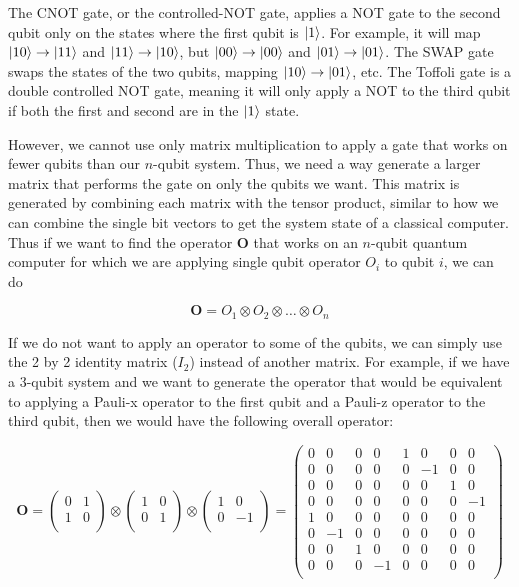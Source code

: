 \documentclass[11pt]{report}
\newcommand{\?}{\stackrel{?}{=}}
\begin{document}
The CNOT gate, or the controlled-NOT gate, applies a NOT gate to the second qubit only on the states where the first qubit is $\ket{1}$. For example, it will map $\ket{10} \to \ket{11}$ and $\ket{11} \to \ket{10}$, but $\ket{00} \to \ket{00}$ and $\ket{01} \to \ket{01}$. The SWAP gate swaps the states of the two qubits, mapping $\ket{10} \to \ket{01}$, etc. The Toffoli gate is a double controlled NOT gate, meaning it will only apply a NOT to the third qubit if both the first and second are in the $\ket{1}$ state.

However, we cannot use only matrix multiplication to apply a gate that works on fewer qubits than our $n$-qubit system. Thus, we need a way generate a larger matrix that performs the gate on only the qubits we want. This matrix is generated by combining each matrix with the tensor product, similar to how we can combine the single bit vectors to get the system state of a classical computer. Thus if we want to find the operator $\mathbf{O}$ that works on an $n$-qubit quantum computer for which we are applying single qubit operator $O_i$ to qubit $i$, we can do

$$\mathbf{O} = O_1 \otimes O_2 \otimes \ldots \otimes O_n$$

If we do not want to apply an operator to some of the qubits, we can simply use the 2 by 2 identity matrix ($I_2$) instead of another matrix. For example, if we have a 3-qubit system and we want to generate the operator that would be equivalent to applying a Pauli-x operator to the first qubit and a Pauli-z operator to the third qubit, then we would have the following overall operator:

$$\mathbf{O} = \begin{pmatrix}0 & 1 \\1 & 0 \\\end{pmatrix} \otimes \begin{pmatrix}1 & 0 \\0 & 1 \\\end{pmatrix} \otimes \begin{pmatrix}1 & 0 \\0 & -1 \\\end{pmatrix} = \begin{pmatrix}
0 & 0 & 0 & 0 & 1 & 0 & 0 & 0 \\
0 & 0 & 0 & 0 & 0 & -1 & 0 & 0 \\
0 & 0 & 0 & 0 & 0 & 0 & 1 & 0 \\
0 & 0 & 0 & 0 & 0 & 0 & 0 & -1 \\
1 & 0 & 0 & 0 & 0 & 0 & 0 & 0 \\
0 & -1 & 0 & 0 & 0 & 0 & 0 & 0 \\
0 & 0 & 1 & 0 & 0 & 0 & 0 & 0 \\
0 & 0 & 0 & -1 & 0 & 0 & 0 & 0 \\
\end{pmatrix}$$
\end{document}

